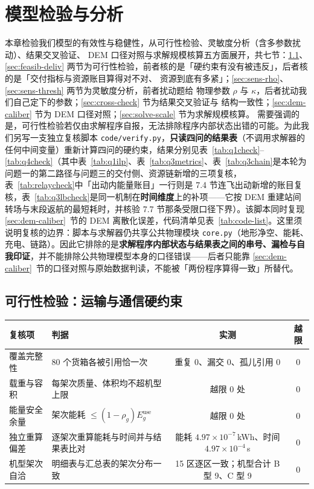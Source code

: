 \section{模型检验与分析}
\label{sec:validation}

本章检验我们模型的有效性与稳健性，从可行性检验、灵敏度分析（含多参数扰动）、结果交叉验证、
DEM 口径对照与求解规模核算五方面展开，共七节：\ref{sec:feasib-hard}、\ref{sec:feasib-deliv}
两节为可行性检验，前者核的是「硬约束有没有被违反」，后者核的是「交付指标与资源账目算得对不对、
资源到底有多紧」；\ref{sec:sens-rho}、\ref{sec:sens-thresh} 两节为灵敏度分析，前者扰动题给
物理参数 $\rho$ 与 $\kappa$，后者扰动我们自己定下的参数；\ref{sec:cross-check} 节为结果交叉验证与
结构一致性；\ref{sec:dem-caliber} 节为 DEM 口径对照；\ref{sec:solve-scale} 节为求解规模核算。
需要强调的是，可行性检验若仅由求解程序自报，无法排除程序内部状态出错的可能。为此我们另写一支独立复核脚本 \texttt{code/verify.py}，\textbf{只读四问的结果表}（不调用求解器的任何中间变量）重新计算四问的硬约束，结果分别见表~\ref{tab:q1check}--\ref{tab:q4check}（其中表~\ref{tab:q1ilp}、表~\ref{tab:q3metrics}、表~\ref{tab:q3chain}是本轮为问题一的第二路径与问题三的交付侧、资源链新增的三项复核，表~\ref{tab:relaycheck}中「出动内能量账目」一行则是 7.4 节连飞出动新增的账目复核，表~\ref{tab:q3lbcheck}是同一机制在\textbf{时间维度}上的补项——它按 DEM 重建站间转场与末段返航的最短耗时，并核验 7.7 节那条受限口径下界）。该脚本同时复现 \ref{sec:dem-caliber}~节的 DEM 离散化误差，代码清单见表~\ref{tab:code-list}。这里须说明复核的边界：脚本与求解器仍共享公共物理模块 \texttt{core.py}（地形净空、能耗、充电、链路）。因此它排除的是\textbf{求解程序内部状态与结果表之间的串号、漏检与自我印证}，并不能排除公共物理模型本身的口径错误——后者只能靠 \ref{sec:dem-caliber}~节的口径对照与原始数据判读，不能被「两份程序算得一致」所替代。

\subsection{可行性检验：运输与通信硬约束}
\label{sec:feasib-hard}

\begin{center}
\begin{minipage}{\textwidth}
	\label{tab:q1check}
	\centering
	\begin{tabularx}{0.98\textwidth}{lXcc}
		\toprule
		复核项 & 判据 & 实测 & 越限 \\
		\midrule
		覆盖完整性 & 80 个货箱各被引用恰一次 & 重复 0、漏交 0、孤儿引用 0 & 0 \\
		载重与容积 & 每架次质量、体积均不超机型上限 & 越限 0 处 & 0 \\
		能量安全余量 & 架次能耗 $\le (1-\rho_g)E_g^{\mathrm{use}}$ & 越限 0 处 & 0 \\
		独立重算偏差 & 逐架次重算能耗与时间并与结果表比对 & 能耗 $4.97\times10^{-7}$\,kWh、时间 $4.97\times10^{-4}$\,s & 0 \\
		机型架次自洽 & 明细表与汇总表的架次分布一致 & 15 区逐区一致；机型合计 B 型 9、C 型 9 & 0 \\
		\bottomrule
	\end{tabularx}
\end{minipage}
\end{center}

